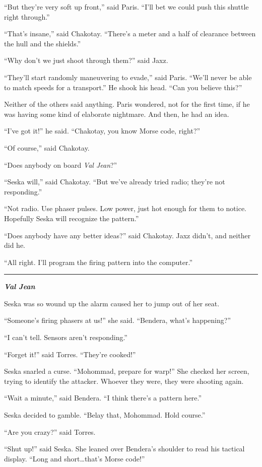 \documentclass[twoside,letterpaper,12pt]{memoir}
\begin{document}
``But they're very soft up front,'' said Paris. ``I'll bet we could push this shuttle right through.''

``That's insane,'' said Chakotay. ``There's a meter and a half of clearance between the hull and the shields.''

``Why don't we just shoot through them?'' said Jaxz.

``They'll start randomly maneuvering to evade,'' said Paris. ``We'll never be able to match speeds for a transport.'' He shook his head. ``Can you believe this?''

Neither of the others said anything. Paris wondered, not for the first time, if he was having some kind of elaborate nightmare. And then, he had an idea.

``I've got it!'' he said. ``Chakotay, you know Morse code, right?''

``Of course,'' said Chakotay.

``Does anybody on board \textit{Val Jean}?''

``Seska will,'' said Chakotay. ``But we've already tried radio; they're not responding.''

``Not radio. Use phaser pulses. Low power, just hot enough for them to notice. Hopefully Seska will recognize the pattern.''

``Does anybody have any better ideas?'' said Chakotay. Jaxz didn't, and neither did he.

``All right. I'll program the firing pattern into the computer.''

\fancybreak{\rule{3cm}{0.4 pt}}
\textit{\textbf{Val Jean}}

Seska was so wound up the alarm caused her to jump out of her seat.

``Someone's firing phasers at us!'' she said. ``Bendera, what’s happening?''

``I can’t tell. Sensors aren’t responding.''

``Forget it!'' said Torres. ``They're cooked!''

Seska snarled a curse. ``Mohommad, prepare for warp!'' She checked her screen, trying to identify the attacker. Whoever they were, they were shooting again.

``Wait a minute,'' said Bendera. ``I think there’s a pattern here.''

Seska decided to gamble. ``Belay that, Mohommad. Hold course.''

``Are you crazy?'' said Torres.

``Shut up!'' said Seska. She leaned over Bendera’s shoulder to read his tactical display. ``Long and short\ldots that's Morse code!''
\end{document}
